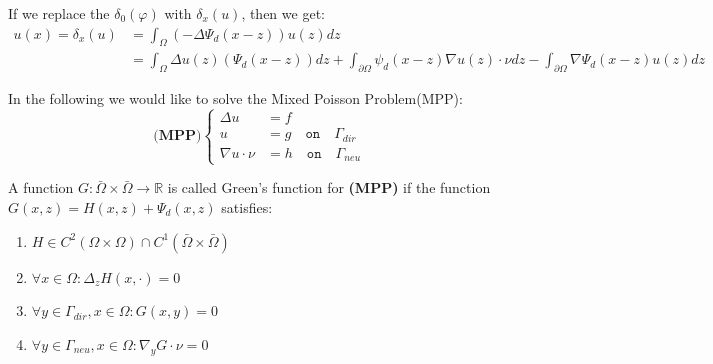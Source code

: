 \begin{example}
If we replace the $\delta_0(\varphi)$ with $\delta_x(u)$, then we get:
\begin{align*}
	u(x) = \delta_x(u) &= \int_\Omega (- \Delta \Psi_d(x-z)) u(z) dz \\
	&= \int_\Omega \Delta u(z)(\Psi_d(x-z))dz + \int_{\partial \Omega} \psi_d(x-z)\nabla u(z)\cdot \nu dz - \int_{\partial \Omega}\nabla\Psi_d(x-z) u(z)dz
\end{align*}
\end{example}

In the following we would like to solve the Mixed Poisson Problem(MPP):
\begin{equation}
\textbf{(MPP)}\left\{
\begin{aligned}
	 	\Delta u &= f\\
	 	u &= g \quad \texttt{on} \quad \Gamma_{dir} \\
	 	\nabla u \cdot \nu &= h \quad \texttt{on} \quad \Gamma_{neu}
\end{aligned}
\right.
\end{equation}

\begin{definition}
	A function $G:\bar{\Omega} \times \bar{\Omega} \rightarrow \mathbb{R}$ is called Green's function for \textbf{(MPP)} if the function $ G(x, z) = H(x, z) + \Psi_d(x, z)$ satisfies:
	\begin{enumerate}
		\item $H \in C^2(\Omega \times \Omega) \cap C^1(\bar{\Omega} \times \bar{\Omega})$
		\item $\forall x \in \Omega : \Delta_z H(x, \cdot) = 0$
		\item $\forall y \in \Gamma_{dir}, x \in \Omega: G(x, y) = 0$
		\item $\forall y \in \Gamma_{neu}, x \in \Omega: \nabla_y G \cdot \nu = 0$
	\end{enumerate}
\end{definition}

